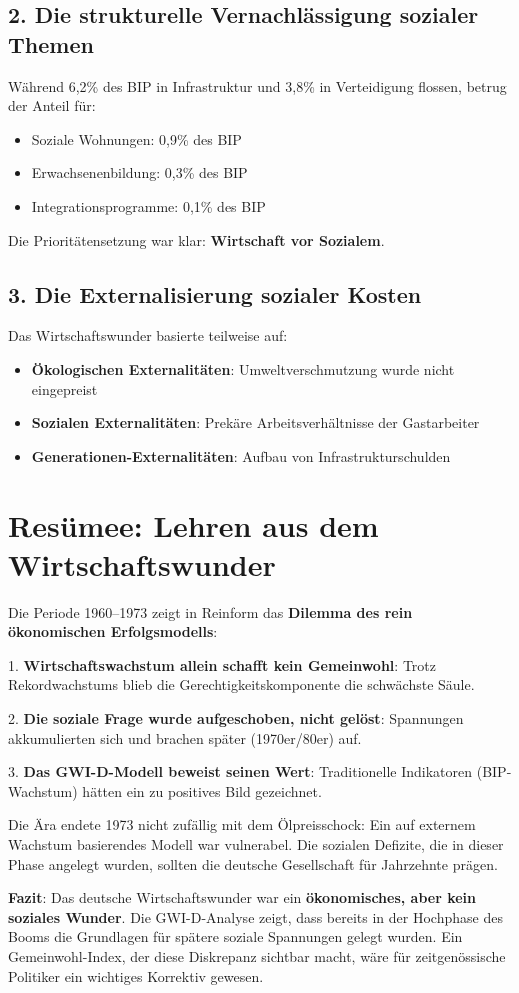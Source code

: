 \subsection{2. Die strukturelle Vernachlässigung sozialer Themen}

Während 6,2\% des BIP in Infrastruktur und 3,8\% in Verteidigung flossen, betrug der Anteil für:
\begin{itemize}
    \item Soziale Wohnungen: 0,9\% des BIP
    \item Erwachsenenbildung: 0,3\% des BIP  
    \item Integrationsprogramme: 0,1\% des BIP
\end{itemize}

Die Prioritätensetzung war klar: \textbf{Wirtschaft vor Sozialem}.

\subsection{3. Die Externalisierung sozialer Kosten}

Das Wirtschaftswunder basierte teilweise auf:
\begin{itemize}
    \item \textbf{Ökologischen Externalitäten}: Umweltverschmutzung wurde nicht eingepreist
    \item \textbf{Sozialen Externalitäten}: Prekäre Arbeitsverhältnisse der Gastarbeiter
    \item \textbf{Generationen-Externalitäten}: Aufbau von Infrastrukturschulden
\end{itemize}

\section{Resümee: Lehren aus dem Wirtschaftswunder}

Die Periode 1960–1973 zeigt in Reinform das \textbf{Dilemma des rein ökonomischen Erfolgsmodells}:

1. \textbf{Wirtschaftswachstum allein schafft kein Gemeinwohl}: Trotz Rekordwachstums blieb die Gerechtigkeitskomponente die schwächste Säule.

2. \textbf{Die soziale Frage wurde aufgeschoben, nicht gelöst}: Spannungen akkumulierten sich und brachen später (1970er/80er) auf.

3. \textbf{Das GWI-D-Modell beweist seinen Wert}: Traditionelle Indikatoren (BIP-Wachstum) hätten ein zu positives Bild gezeichnet.

Die Ära endete 1973 nicht zufällig mit dem Ölpreisschock: Ein auf externem Wachstum basierendes Modell war vulnerabel. Die sozialen Defizite, die in dieser Phase angelegt wurden, sollten die deutsche Gesellschaft für Jahrzehnte prägen.

\textbf{Fazit}: Das deutsche Wirtschaftswunder war ein \textbf{ökonomisches, aber kein soziales Wunder}. Die GWI-D-Analyse zeigt, dass bereits in der Hochphase des Booms die Grundlagen für spätere soziale Spannungen gelegt wurden. Ein Gemeinwohl-Index, der diese Diskrepanz sichtbar macht, wäre für zeitgenössische Politiker ein wichtiges Korrektiv gewesen.

\endinput